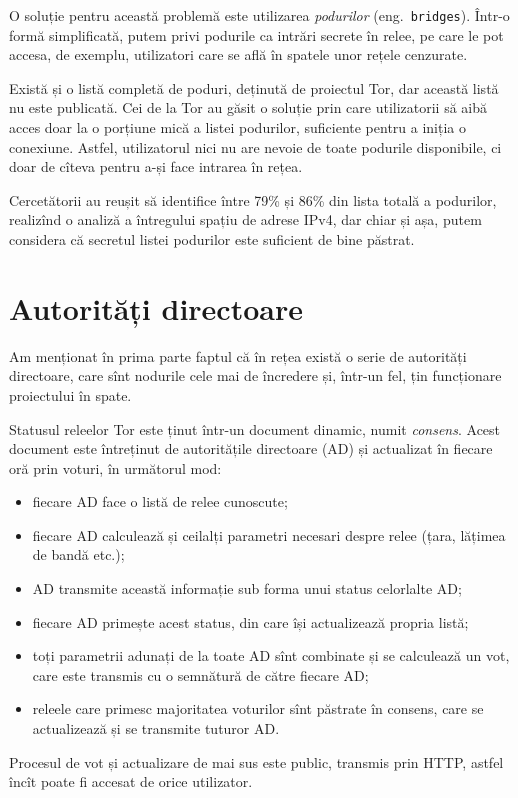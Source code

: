 O soluție pentru această problemă este utilizarea \emph{podurilor} (eng.\ \texttt{bridges}).
Într-o formă simplificată, putem privi podurile ca intrări secrete în relee, pe care le
pot accesa, de exemplu, utilizatori care se află în spatele unor rețele cenzurate.

Există și o listă completă de poduri, deținută de proiectul Tor, dar această listă
nu este publicată. Cei de la Tor au găsit o soluție prin care utilizatorii să aibă
acces doar la o porțiune mică a listei podurilor, suficiente pentru a iniția o conexiune.
Astfel, utilizatorul nici nu are nevoie de toate podurile disponibile, ci doar de cîteva
pentru a-și face intrarea în rețea.

Cercetătorii au reușit să identifice între 79\% și 86\% din lista totală a podurilor,
realizînd o analiză a întregului spațiu de adrese IPv4, dar chiar și așa, putem considera
că secretul listei podurilor este suficient de bine păstrat.

\section{Autorități directoare} 

\indent\indent Am menționat în prima parte faptul că în rețea există o serie
de autorități directoare, care sînt nodurile cele mai de încredere și, într-un fel,
țin funcționare proiectului în spate.

Statusul releelor Tor este ținut într-un document dinamic, numit \emph{consens}. 
Acest document este întreținut de autoritățile directoare (AD) și actualizat
în fiecare oră prin voturi, în următorul mod:
\begin{itemize}
  \item fiecare AD face o listă de relee cunoscute;
  \item fiecare AD calculează și ceilalți parametri necesari despre relee (țara,
    lățimea de bandă etc.);
  \item AD transmite această informație sub forma unui status celorlalte AD;
  \item fiecare AD primește acest status, din care își actualizează propria
    listă;
  \item toți parametrii adunați de la toate AD sînt combinate și se calculează
    un vot, care este transmis cu o semnătură de către fiecare AD;
  \item releele care primesc majoritatea voturilor sînt păstrate în consens, care
    se actualizează și se transmite tuturor AD.
\end{itemize}

Procesul de vot și actualizare de mai sus este public, transmis prin HTTP, astfel
încît poate fi accesat de orice utilizator.
